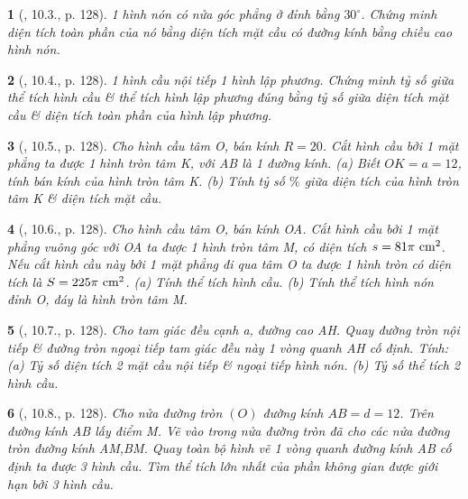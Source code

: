 \documentclass{article}
\newtheorem{baitoan}{}
\begin{document}
\begin{baitoan}[\cite{Binh_boi_duong_Toan_9_tap_2}, 10.3., p. 128]
	1 hình nón có nửa góc phẳng ở đỉnh bằng $30^\circ$. Chứng minh diện tích toàn phần của nó bằng diện tích mặt cầu có đường kính bằng chiều cao hình nón.
\end{baitoan}

\begin{baitoan}[\cite{Binh_boi_duong_Toan_9_tap_2}, 10.4., p. 128]
	1 hình cầu nội tiếp 1 hình lập phương. Chứng minh tỷ số giữa thể tích hình cầu \& thể tích hình lập phương đúng bằng tỷ số giữa diện tích mặt cầu \& diện tích toàn phần của hình lập phương.
\end{baitoan}

\begin{baitoan}[\cite{Binh_boi_duong_Toan_9_tap_2}, 10.5., p. 128]
	Cho hình cầu tâm O, bán kính $R = 20$. Cắt hình cầu bởi 1 mặt phẳng ta được 1 hình tròn tâm K, với AB là 1 đường kính. (a) Biết $OK = a = 12$, tính bán kính của hình tròn tâm K. (b) Tính tỷ số $\%$ giữa diện tích của hình tròn tâm K \& diện tích mặt cầu.
\end{baitoan}

\begin{baitoan}[\cite{Binh_boi_duong_Toan_9_tap_2}, 10.6., p. 128]
	Cho hình cầu tâm O, bán kính OA. Cắt hình cầu bởi 1 mặt phẳng vuông góc với OA ta được 1 hình tròn tâm M, có diện tích $s = 81\pi\ {\rm cm}^2$. Nếu cắt hình cầu này bởi 1 mặt phẳng đi qua tâm O ta được 1 hình tròn có diện tích là $S = 225\pi\ {\rm cm}^2$. (a) Tính thể tích hình cầu. (b) Tính thể tích hình nón đỉnh O, đáy là hình tròn tâm M.
\end{baitoan}

\begin{baitoan}[\cite{Binh_boi_duong_Toan_9_tap_2}, 10.7., p. 128]
	Cho tam giác đều cạnh a, đường cao AH. Quay đường tròn nội tiếp \& đường tròn ngoại tiếp tam giác đều này 1 vòng quanh AH cố định. Tính: (a) Tỷ số diện tích 2 mặt cầu nội tiếp \& ngoại tiếp hình nón. (b) Tỷ số thể tích 2 hình cầu.
\end{baitoan}

\begin{baitoan}[\cite{Binh_boi_duong_Toan_9_tap_2}, 10.8., p. 128]
	Cho nửa đường tròn $(O)$ đường kính $AB = d = 12$. Trên đường kính AB lấy điểm M. Vẽ vào trong nửa đường tròn đã cho các nửa đường tròn đường kính AM,BM. Quay toàn bộ hình vẽ 1 vòng quanh đường kính AB cố định ta được 3 hình cầu. Tìm thể tích lớn nhất của phần không gian được giới hạn bởi 3 hình cầu.
\end{baitoan}
\end{document}

